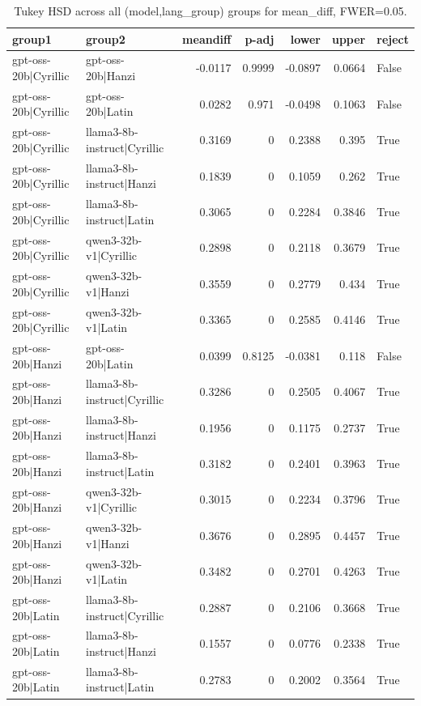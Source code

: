 \begin{table}
\caption{Tukey HSD across all (model,lang_group) groups for mean_diff, FWER=0.05.}
\label{tab:tukey_all_models_all_langgroups_mean_diff}
\begin{tabular}{l l r r r r l}
\toprule
group1 & group2 & meandiff & p-adj & lower & upper & reject \\
\midrule
gpt-oss-20b|Cyrillic & gpt-oss-20b|Hanzi & -0.0117 & 0.9999 & -0.0897 & 0.0664 & False \\
gpt-oss-20b|Cyrillic & gpt-oss-20b|Latin & 0.0282 & 0.971 & -0.0498 & 0.1063 & False \\
gpt-oss-20b|Cyrillic & llama3-8b-instruct|Cyrillic & 0.3169 & 0 & 0.2388 & 0.395 & True \\
gpt-oss-20b|Cyrillic & llama3-8b-instruct|Hanzi & 0.1839 & 0 & 0.1059 & 0.262 & True \\
gpt-oss-20b|Cyrillic & llama3-8b-instruct|Latin & 0.3065 & 0 & 0.2284 & 0.3846 & True \\
gpt-oss-20b|Cyrillic & qwen3-32b-v1|Cyrillic & 0.2898 & 0 & 0.2118 & 0.3679 & True \\
gpt-oss-20b|Cyrillic & qwen3-32b-v1|Hanzi & 0.3559 & 0 & 0.2779 & 0.434 & True \\
gpt-oss-20b|Cyrillic & qwen3-32b-v1|Latin & 0.3365 & 0 & 0.2585 & 0.4146 & True \\
gpt-oss-20b|Hanzi & gpt-oss-20b|Latin & 0.0399 & 0.8125 & -0.0381 & 0.118 & False \\
gpt-oss-20b|Hanzi & llama3-8b-instruct|Cyrillic & 0.3286 & 0 & 0.2505 & 0.4067 & True \\
gpt-oss-20b|Hanzi & llama3-8b-instruct|Hanzi & 0.1956 & 0 & 0.1175 & 0.2737 & True \\
gpt-oss-20b|Hanzi & llama3-8b-instruct|Latin & 0.3182 & 0 & 0.2401 & 0.3963 & True \\
gpt-oss-20b|Hanzi & qwen3-32b-v1|Cyrillic & 0.3015 & 0 & 0.2234 & 0.3796 & True \\
gpt-oss-20b|Hanzi & qwen3-32b-v1|Hanzi & 0.3676 & 0 & 0.2895 & 0.4457 & True \\
gpt-oss-20b|Hanzi & qwen3-32b-v1|Latin & 0.3482 & 0 & 0.2701 & 0.4263 & True \\
gpt-oss-20b|Latin & llama3-8b-instruct|Cyrillic & 0.2887 & 0 & 0.2106 & 0.3668 & True \\
gpt-oss-20b|Latin & llama3-8b-instruct|Hanzi & 0.1557 & 0 & 0.0776 & 0.2338 & True \\
gpt-oss-20b|Latin & llama3-8b-instruct|Latin & 0.2783 & 0 & 0.2002 & 0.3564 & True \\

\end{tabular}
\end{table}
